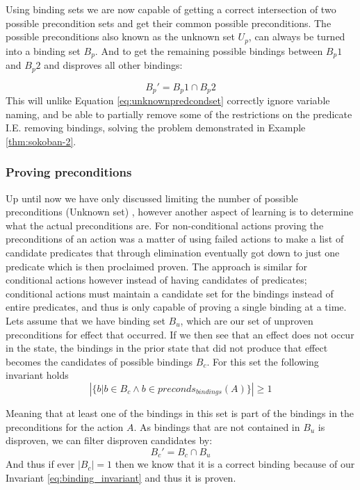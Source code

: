 \documentclass[../Master.tex]{subfiles}
\begin{document}
Using binding sets we are now capable of getting a correct intersection of two possible precondition sets and get their common possible preconditions. The possible preconditions also known as the unknown set $U_p$, can always be turned into a binding set $B_p$. 
And to get the remaining possible bindings between $B_p1$ and $B_p2$ and disproves all other bindings:
 
\begin{equation}
B_p' = B_p1 \cap B_p2
\end{equation}
This will unlike Equation \ref{eq:unknownpredcondset} correctly ignore variable naming, and be able to partially remove some of the restrictions on the predicate I.E. removing bindings, solving the problem demonstrated in Example \ref{thm:sokoban-2}.

\subsubsection{Proving preconditions}
Up until now we have only discussed limiting the number of possible preconditions (Unknown set) , however another aspect of learning is to determine what the actual preconditions are. 
For non-conditional actions proving the preconditions of an action was a matter of using failed actions to make a list of candidate predicates that through elimination eventually got down to just one predicate which is then proclaimed proven. The approach is similar for conditional actions however instead of having candidates of predicates; conditional actions must maintain a candidate set for the bindings instead of entire predicates, and thus is only capable of proving a single binding at a time. 
Lets assume that we have binding set $B_u$, which are our set of unproven preconditions for effect that occurred. 
If we then see that an effect does not occur in the state, the bindings in the prior state that did not produce that effect becomes the candidates of possible bindings $B_c$. For this set the following invariant holds
\begin{equation} \label{eq:binding_invariant}
\left| \{b  |  b \in B_c \land b \in preconds_{bindings}(A)\} \right|  \ge 1
\end{equation}


Meaning that at least one of the bindings in this set is part of the bindings in the preconditions for the action $A$. As bindings that are not contained in $B_u$ is disproven, we can filter disproven candidates by:
\begin{equation}
B_c' = B_c \cap B_u
\end{equation}
And thus if ever $|B_c| = 1$ then we know that it is a correct binding because of our Invariant \ref{eq:binding_invariant} and thus it is proven.
\end{document}
